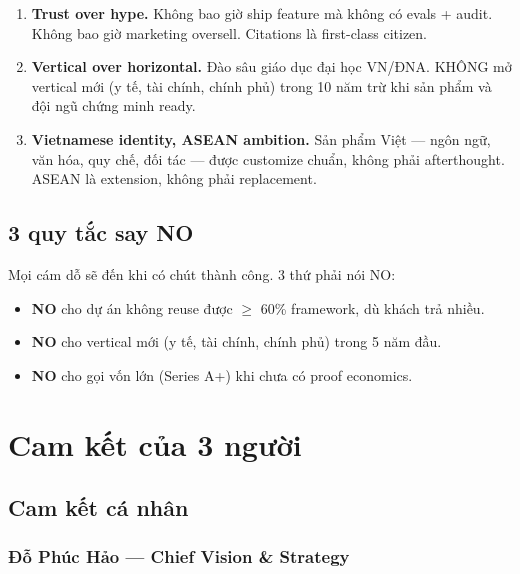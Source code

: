 \documentclass[11pt,a4paper]{article}
\begin{document}
\begin{enumerate}
\item \textbf{Trust over hype.} Không bao giờ ship feature mà không có evals + audit. Không bao giờ marketing oversell. Citations là first-class citizen.

\item \textbf{Vertical over horizontal.} Đào sâu giáo dục đại học VN/ĐNA. KHÔNG mở vertical mới (y tế, tài chính, chính phủ) trong 10 năm trừ khi sản phẩm và đội ngũ chứng minh ready.

\item \textbf{Vietnamese identity, ASEAN ambition.} Sản phẩm Việt --- ngôn ngữ, văn hóa, quy chế, đối tác --- được customize chuẩn, không phải afterthought. ASEAN là extension, không phải replacement.
\end{enumerate}

\subsection{3 quy tắc say NO}

Mọi cám dỗ sẽ đến khi có chút thành công. 3 thứ phải nói NO:

\begin{itemize}
\item \textbf{NO} cho dự án không reuse được $\geq$ 60\% framework, dù khách trả nhiều.
\item \textbf{NO} cho vertical mới (y tế, tài chính, chính phủ) trong 5 năm đầu.
\item \textbf{NO} cho gọi vốn lớn (Series A+) khi chưa có proof economics.
\end{itemize}

\clearpage

\section{Cam kết của 3 người}

\subsection{Cam kết cá nhân}

\subsubsection*{Đỗ Phúc Hảo --- Chief Vision \& Strategy}
\end{document}
